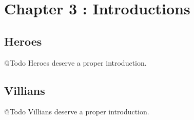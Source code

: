 \chapter{Chapter 3 : Introductions}

\section{Heroes}
@Todo Heroes deserve a proper introduction.


\section{Villians}
@Todo Villians deserve a proper introduction.



